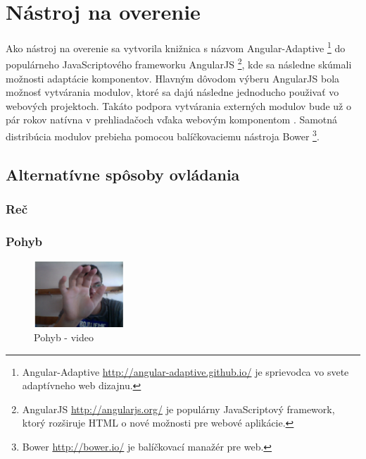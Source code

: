 \section{Nástroj na overenie} %
\label{sec:n_stroj_na_overenie}
Ako nástroj na overenie sa vytvorila knižnica s názvom Angular-Adaptive \footnote{Angular-Adaptive \url{http://angular-adaptive.github.io/} je sprievodca vo svete adaptívneho web dizajnu.} do populárneho JavaScriptového frameworku AngularJS \footnote{AngularJS \url{http://angularjs.org/} je populárny JavaScriptový framework, ktorý rozširuje HTML o nové možnosti pre webové aplikácie.}, kde sa následne skúmali možnosti adaptácie komponentov. Hlavným dôvodom výberu AngularJS bola možnosť vytvárania modulov, ktoré sa dajú následne jednoducho použivať vo webových projektoch. Takáto podpora vytvárania externých modulov bude už o pár rokov natívna v prehliadačoch vďaka webovým komponentom \cite{webcomponents}. Samotná distribúcia modulov prebieha pomocou balíčkovaciemu nástroja Bower \footnote{Bower \url{http://bower.io/} je balíčkovací manažér pre web.}.

\subsection{Alternatívne spôsoby ovládania} %
\label{sub:alternat_vne_sp_soby_ovl_dania}

\subsubsection{Reč} %
\label{ssub:re_}



\subsubsection{Pohyb} %
\label{ssub:pohyb}

\begin{figure}[H]
  \centering
  \includegraphics[width=0.3\textwidth]{img/motion/video.png}
  \caption[Pohyb - video]{
    Pohyb - video}
  \label{fig: motion-video}
\end{figure}

